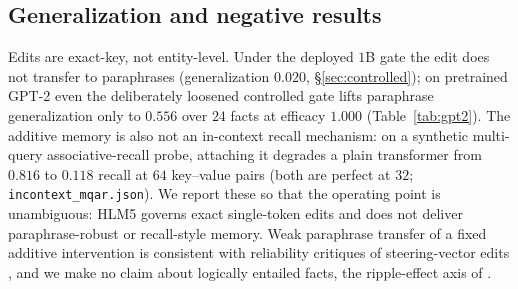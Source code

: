 \documentclass[11pt]{article}
\theoremstyle{remark}
\begin{document}
\begin{table}[t]
\centering
\small
{}
\caption{Synthetic injection-vs-$K$ on a toy LM (single \texttt{TransformerEncoderLayer}),
\emph{not} the $1$B trunk. At $D{=}64$ a collateral wall appears at $K{=}96$
(others-intact $0.000$); at $D{=}256$ adequate edit strength is required for
efficacy. Data: \texttt{lm\_kb\_inject.json} ($D{=}64$),
\texttt{lm\_kb\_inject\_d256.json} ($D{=}256$, $\beta{=}25$),
\texttt{lm\_kb\_inject\_d256\_b70.json} ($D{=}256$, $\beta{=}70$);
$\beta{=}25$ is the producing script's default, recorded in the script, not the JSON.}
\label{tab:ksweep}
\end{table}

\subsection{Generalization and negative results}
\label{sec:gen}

Edits are exact-key, not entity-level. Under the deployed $1$B gate the edit does
not transfer to paraphrases (generalization $0.020$, \S\ref{sec:controlled}); on
pretrained GPT-2 even the deliberately loosened controlled gate lifts paraphrase
generalization only to $0.556$ over $24$ facts at efficacy $1.000$
(Table~\ref{tab:gpt2}). The additive memory is also not an in-context recall
mechanism: on a synthetic multi-query associative-recall probe, attaching it
degrades a plain transformer from $0.816$ to $0.118$ recall at $64$ key--value
pairs (both are perfect at $32$; \texttt{incontext\_mqar.json}). We report these so that the operating point is
unambiguous: HLM5 governs exact single-token edits and does not deliver
paraphrase-robust or recall-style memory. Weak paraphrase transfer of a fixed
additive intervention is consistent with reliability critiques of steering-vector
edits \citep{tan2024steering}, and we make no claim about logically entailed
facts, the ripple-effect axis of \citet{cohen2024ripple}.
\end{document}
